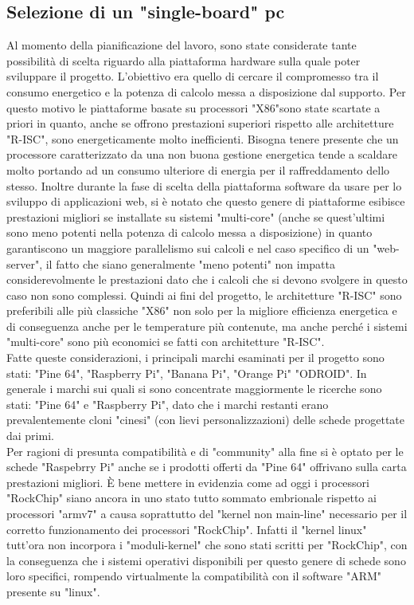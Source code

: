 \subsection{Selezione di un "single-board" pc}
Al momento della pianificazione del lavoro, sono state considerate tante possibilità di scelta riguardo alla piattaforma hardware sulla quale poter sviluppare il progetto. L'obiettivo era quello di cercare il compromesso tra il consumo energetico e la potenza di calcolo messa a disposizione dal supporto. Per questo motivo le piattaforme basate su processori "X86"sono state scartate a priori in quanto, anche se offrono prestazioni superiori rispetto alle architetture "R-ISC", sono energeticamente molto inefficienti. Bisogna tenere presente che un processore caratterizzato da una non buona gestione energetica tende a scaldare molto portando ad un consumo ulteriore di energia per il raffreddamento dello stesso.  Inoltre durante la fase di scelta della piattaforma software da usare per lo sviluppo di applicazioni web, si è notato che questo genere di piattaforme esibisce prestazioni migliori se installate su sistemi "multi-core" (anche se quest'ultimi sono meno potenti nella potenza di calcolo messa a disposizione) in quanto garantiscono un maggiore parallelismo sui calcoli e nel caso specifico di un "web-server", il fatto che siano generalmente "meno potenti" non impatta considerevolmente le prestazioni dato che i calcoli che si devono svolgere in questo caso non sono complessi. Quindi ai fini del progetto, le architetture "R-ISC" sono preferibili alle più classiche "X86" non solo per la migliore efficienza energetica e di conseguenza anche per le temperature più contenute, ma anche perché i sistemi "multi-core" sono più economici se fatti con architetture "R-ISC".\\
Fatte queste considerazioni, i principali marchi esaminati per il progetto sono stati: "Pine 64", "Raspberry Pi", "Banana Pi", "Orange Pi" "ODROID". In generale i marchi sui quali si sono concentrate maggiormente le ricerche sono stati: "Pine 64" e "Raspberry Pi", dato che i marchi restanti erano prevalentemente cloni "cinesi" (con lievi personalizzazioni) delle schede progettate dai primi.\\
Per ragioni di presunta compatibilità e di "community" alla fine si è optato per le schede "Raspebrry Pi" anche se i prodotti offerti da "Pine 64" offrivano sulla carta prestazioni migliori. È bene mettere in evidenzia come ad oggi i processori "RockChip" siano ancora in uno stato tutto sommato embrionale rispetto ai processori "armv7"  a causa soprattutto del "kernel non main-line" necessario per il corretto funzionamento dei processori "RockChip". Infatti il "kernel linux" tutt'ora non incorpora i "moduli-kernel" che sono stati scritti per "RockChip", con la conseguenza che i sistemi operativi disponibili per questo genere di schede sono loro specifici, rompendo virtualmente la compatibilità con il software "ARM" presente su "linux".\\
